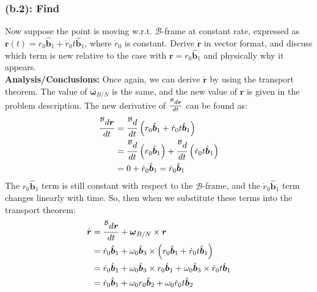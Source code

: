 \documentclass[titlepage]{article}
\begin{document}
\subsubsection*{(b.2): Find}
Now suppose the point is moving w.r.t. $\mathcal{B}$-frame at constant rate, expressed as $\boldsymbol{r}(t)=r_0\hat{\boldsymbol{b}}_1+\dot{r}_0t\hat{\boldsymbol{b}}_1$, where $\dot{r}_0$ is constant. Derive $\dot{\boldsymbol{r}}$ in vector format, and discuss which term is new relative to the case with $\boldsymbol{r}=r_0\hat{\boldsymbol{b}}_1$ and physically why it appears.\\

\textbf{Analysis/Conclusions:}
Once again, we can derive $\dot{\boldsymbol{r}}$ by using the transport theorem. The value of $\boldsymbol{\omega}_{B/N}$ is the same, and the new value of $\boldsymbol{r}$ is given in the problem description. The new derivative of $\frac{\prescript{\mathcal{B}}{}{d}\boldsymbol{r}}{dt}$ can be found as:
\begin{equation}
	\begin{split}
		\frac{\prescript{\mathcal{B}}{}{d}\boldsymbol{r}}{dt}&=\frac{\prescript{\mathcal{B}}{}{d}}{dt}\left(r_0\hat{\boldsymbol{b}}_1+\dot{r}_0t\hat{\boldsymbol{b}}_1\right)\\
		&=\frac{\prescript{\mathcal{B}}{}{d}}{dt}\left(r_0\hat{\boldsymbol{b}}_1\right)+\frac{\prescript{\mathcal{B}}{}{d}}{dt}\left(\dot{r}_0t\hat{\boldsymbol{b}}_1\right)\\
		&=0+\dot{r}_0\hat{\boldsymbol{b}}_1=\dot{r}_0\hat{\boldsymbol{b}}_1\\
	\end{split}
\end{equation}
The $r_0\hat{\boldsymbol{b}}_1$ term is still constant with respect to the $\mathcal{B}$-frame, and the $\dot{r}_0\hat{\boldsymbol{b}}_1$ term changes linearly with time. So, then when we substitute these terms into the transport theorem:
\begin{equation}
	\begin{split}
		\dot{\boldsymbol{r}}&=\frac{\prescript{\mathcal{B}}{}{d}\boldsymbol{r}}{dt}+\boldsymbol{\omega}_{B/N}\times\boldsymbol{r}\\
		&=\dot{r}_0\hat{\boldsymbol{b}}_1+\omega_0\hat{\boldsymbol{b}}_3\times\left(r_0\hat{\boldsymbol{b}}_1+\dot{r}_0t\hat{\boldsymbol{b}}_1\right)\\
		&=\dot{r}_0\hat{\boldsymbol{b}}_1+\omega_0\hat{\boldsymbol{b}}_3\times r_0\hat{\boldsymbol{b}}_1+ \omega_0\hat{\boldsymbol{b}}_3\times\dot{r}_0t\hat{\boldsymbol{b}}_1\\
		&=\dot{r}_0\hat{\boldsymbol{b}}_1+\omega_0 r_0\hat{\boldsymbol{b}}_2+\omega_0\dot{r}_0t\hat{\boldsymbol{b}}_2
	\end{split}
\end{equation}
\end{document}
